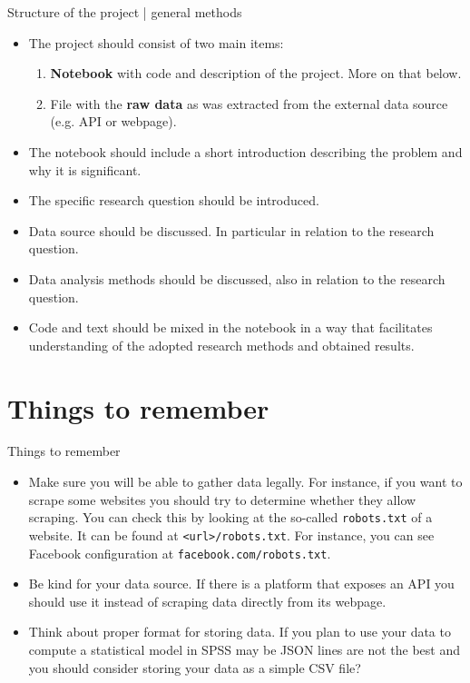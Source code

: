 \documentclass{beamer}
\begin{document}
\begin{frame}{Structure of the project | general methods}
    \begin{itemize}
     \item The project should consist of two main items:
     \begin{enumerate}
     \item \textbf{Notebook} with code and description of the project.
     More on that below.
     \item File with the \textbf{raw data} as was extracted from the external
     data source (e.g. API or webpage).
     \end{enumerate}
     \item The notebook should include a short introduction describing the
     problem and why it is significant.
     \item The specific research question should be introduced.
     \item Data source should be discussed. In particular in relation to the
     research question.
     \item Data analysis methods should be discussed, also in relation to the
     research question.
     \item Code and text should be mixed in the notebook in a way that
     facilitates understanding of the adopted research methods and obtained
     results.
    \end{itemize}
\end{frame}
    
\section[Things to remember]{Things to remember}
\begin{frame}{Things to remember}
    \begin{itemize}
     \item Make sure you will be able to gather data legally.  For instance, if
     you want to scrape some websites you should try to determine whether they
     allow scraping. You can check this by looking at the so-called
     \texttt{robots.txt} of a website.  It can be found at
     \texttt{<url>/robots.txt}. For instance, you can see Facebook configuration
     at \texttt{facebook.com/robots.txt}.
     \item Be kind for your data source. If there is a platform that exposes an
     API you should use it instead of scraping data directly from its webpage.
     \item Think about proper format for storing data. If you plan to use your
     data to compute a statistical model in SPSS may be JSON lines are not the
     best and you should consider storing your data as a simple CSV file?
    \end{itemize}
\end{frame}
    
\end{document}
